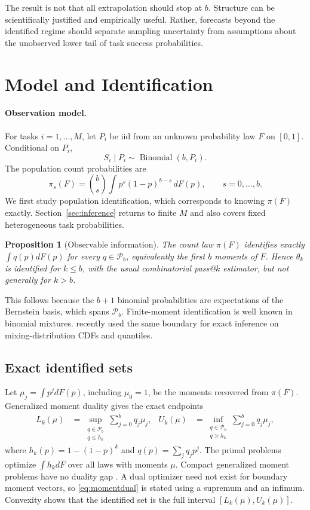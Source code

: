 \documentclass[twoside]{article}
\newtheorem{proposition}{Proposition}
\newcommand{\Pcal}{\mathcal P}
\begin{document}
The result is not that all extrapolation should stop at \(b\). Structure can be scientifically justified and empirically useful. Rather, forecasts beyond the identified regime should separate sampling uncertainty from assumptions about the unobserved lower tail of task success probabilities.

\section{Model and Identification}

\paragraph{Observation model.}
For tasks \(i=1,\ldots,M\), let \(P_i\) be iid from an unknown probability law \(F\) on \([0,1]\). Conditional on \(P_i\), \[ S_i\mid P_i\sim\operatorname{Binomial}(b,P_i). \] The population count probabilities are \[ \pi_s(F)=\binom bs\int p^s(1-p)^{b-s}\,dF(p), \qquad s=0,\ldots,b. \] We first study population identification, which corresponds to knowing \(\pi(F)\) exactly. Section~\ref{sec:inference} returns to finite \(M\) and also covers fixed heterogeneous task probabilities.

\begin{proposition}[Observable information]
\label{prop:moments}
The count law \(\pi(F)\) identifies exactly \(\int q(p)dF(p)\) for every \(q\in\Pcal_b\), equivalently the first \(b\) moments of \(F\). Hence \(\theta_k\) is identified for \(k\leq b\), with the usual combinatorial pass@\(k\) estimator, but not generally for \(k>b\).
\end{proposition}

This follows because the \(b+1\) binomial probabilities are expectations of the Bernstein basis, which spans \(\Pcal_b\). Finite-moment identification is well known in binomial mixtures. \citet{basu2026} recently used the same boundary for exact inference on mixing-distribution CDFs and quantiles.

\subsection{Exact identified sets}

Let \(\mu_j=\int p^j dF(p)\), including \(\mu_0=1\), be the moments recovered from \(\pi(F)\). Generalized moment duality gives the exact endpoints
\begin{align}
 L_k(\mu)
 &=\sup_{\substack{q\in\Pcal_b\\q\leq h_k}}
   \sum_{j=0}^b q_j\mu_j,
&
 U_k(\mu)
 &=\inf_{\substack{q\in\Pcal_b\\q\geq h_k}}
   \sum_{j=0}^b q_j\mu_j,
\label{eq:momentdual}
\end{align}
where \(h_k(p)=1-(1-p)^k\) and \(q(p)=\sum_jq_jp^j\). The primal problems optimize \(\int h_kdF\) over all laws with moments \(\mu\). Compact generalized moment problems have no duality gap \citep{deklerk2019,halaseh2026}. A dual optimizer need not exist for boundary moment vectors, so \eqref{eq:momentdual} is stated using a supremum and an infimum. Convexity shows that the identified set is the full interval \([L_k(\mu),U_k(\mu)]\).
\end{document}
